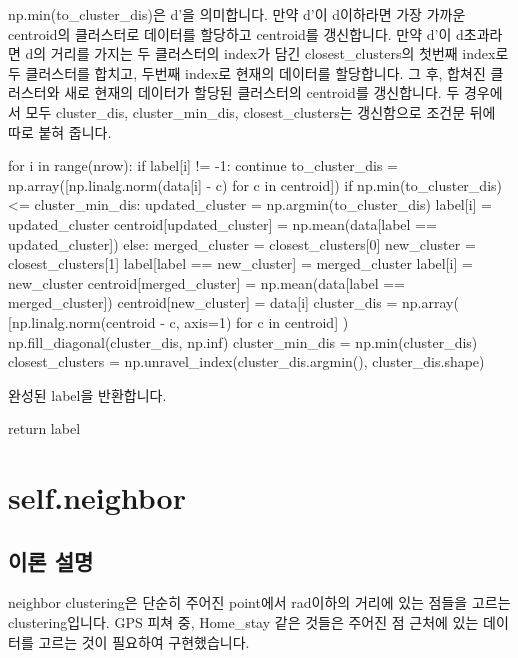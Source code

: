 \documentclass{oblivoir}
\begin{document}
  np.min(to\_cluster\_dis)은 d'을 의미합니다.
  만약 d'이 d이하라면 가장 가까운 centroid의 클러스터로 데이터를 할당하고 centroid를 갱신합니다.
  만약 d'이 d초과라면 d의 거리를 가지는 두 클러스터의 index가 담긴 closest\_clusters의 첫번째 index로 두 클러스터를 합치고, 두번째 index로 현재의 데이터를 할당합니다.
  그 후, 합쳐진 클러스터와 새로 현재의 데이터가 할당된 클러스터의 centroid를 갱신합니다.
  두 경우에서 모두 cluster\_dis, cluster\_min\_dis, closest\_clusters는 갱신함으로 조건문 뒤에 따로 붙혀 줍니다.
  \begin{python}[label={GPS_clustering_24}]
    for i in range(nrow):
      if label[i] != -1:
          continue
      to_cluster_dis = np.array([np.linalg.norm(data[i] - c) for c in centroid])
      if np.min(to_cluster_dis) <= cluster_min_dis:
          updated_cluster = np.argmin(to_cluster_dis)
          label[i] = updated_cluster
          centroid[updated_cluster] = np.mean(data[label == updated_cluster])
      else:
          merged_cluster = closest_clusters[0]
          new_cluster = closest_clusters[1]
          label[label == new_cluster] = merged_cluster
          label[i] = new_cluster
          centroid[merged_cluster] = np.mean(data[label == merged_cluster])
          centroid[new_cluster] = data[i]
      cluster_dis = np.array(
          [np.linalg.norm(centroid - c, axis=1) for c in centroid]
      )
      np.fill_diagonal(cluster_dis, np.inf)
      cluster_min_dis = np.min(cluster_dis)
      closest_clusters = np.unravel_index(cluster_dis.argmin(), cluster_dis.shape)
  \end{python}
  완성된 label을 반환합니다.
  \begin{python}[label={GPS_clustering_25}]
    return label    
  \end{python}

  \section{self.neighbor}
  \subsection{이론 설명}
  neighbor clustering은 단순히 주어진 point에서 rad이하의 거리에 있는 점들을 고르는 clustering입니다.
  GPS 피쳐 중, Home\_stay 같은 것들은 주어진 점 근처에 있는 데이터를 고르는 것이 필요하여 구현했습니다.
\end{document}
